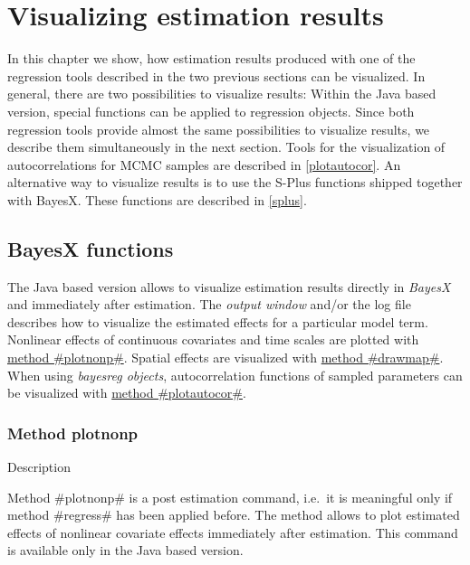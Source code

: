 \chapter{Visualizing estimation results}
\label{visualization} 

In this chapter we show, how estimation results produced with one of
the regression tools described in the two previous sections can be
visualized. In general, there are two possibilities to visualize
results: Within the Java based version, special functions can be
applied to regression objects. Since both regression tools provide
almost the same possibilities to visualize results, we describe them
simultaneously in the next section. Tools for the visualization of
autocorrelations for MCMC samples are described in
\autoref{plotautocor}. An alternative way to visualize results is to
use the S-Plus functions shipped together with BayesX. These
functions are described in \autoref{splus}.

\section{BayesX functions} \label{bayesxplot}

The Java based version allows to visualize estimation results
directly in {\em BayesX} and immediately after estimation. The {\em
output window} and/or the log file describes how to visualize the
estimated effects for a particular model term. Nonlinear effects of
continuous covariates and time scales are plotted with
\hyperref[bayesxplotnonp]{method #plotnonp#}. Spatial effects are
visualized with \hyperref[drawmap]{method #drawmap#}. When using
{\em bayesreg objects}, autocorrelation functions of sampled
parameters can be visualized with \hyperref[plotautocor]{method
#plotautocor#}.

\newpage

\subsection{Method plotnonp} \label{bayesxplotnonp}  

\begin{stanza}{Description}

Method #plotnonp# is a post estimation command, i.e.~it is
meaningful only if method #regress# has been applied before. The
method allows to plot estimated effects of nonlinear covariate
effects immediately after estimation. This command is available
only in the Java based version.

\end{stanza}

